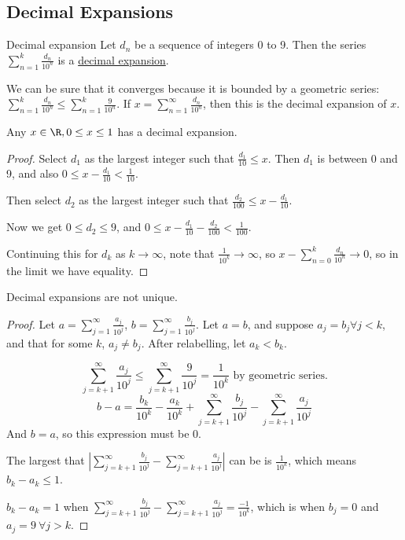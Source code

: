\documentclass[../Main.tex]{subfiles}
\begin{document}
\subsection{Decimal Expansions}
\begin{definition}{Decimal expansion}
    Let $d_n$ be a sequence of integers 0 to 9. Then the series $\sum_{n=1}^{k} \frac{d_n}{10^n}$ is a \underline{decimal expansion}.
\end{definition}
We can be sure that it converges because it is bounded by a geometric series: $\sum_{n=1}^{k} \frac{d_n}{10^n} \leq \sum_{n=1}^{k} \frac{9}{10^n}$.
If $x = \sum_{n=1}^{\infty} \frac{d_n}{10^n}$, then this is the decimal expansion of $x$.
\begin{proposition}
    Any $x \in \R, 0 \leq x \leq 1$ has a decimal expansion.
    \label{propDecimalExpansion}
\end{proposition}
\begin{proof}
    Select $d_1$ as the largest integer such that $\frac{d_1}{10} \leq x$. Then $d_1$ is between 0 and 9, and also $0 \leq x - \frac{d_1}{10} < \frac{1}{10}$.\par
    Then select $d_2$ as the largest integer such that $\frac{d_2}{100} \leq x - \frac{d_1}{10}$.\par
    Now we get $0 \leq d_2 \leq 9$, and $0 \leq x - \frac{d_1}{10} - \frac{d_2}{100} < \frac{1}{100}$.\par
    Continuing this for $d_k$ as $k \rightarrow \infty$, note that $\frac{1}{10^k} \rightarrow \infty$, so $x - \sum_{n=0}^{k} \frac{d_n}{10^n} \rightarrow 0$, so in the limit we have equality.
\end{proof}
\begin{proposition}
    Decimal expansions are not unique.
    \label{propDecimalExpansionUniqueness}
\end{proposition}
\begin{proof}
    Let $a = \sum_{j=1}^{\infty}\frac{a_j}{10^j}$, $b = \sum_{j=1}^{\infty}\frac{b_j}{10^j}$. Let $a = b$, and suppose $a_j = b_j \forall j < k$, and that for some $k$, $a_j \neq b_j$. After relabelling, let $a_k < b_k$.\par
    \begin{equation*}
        \sum_{j=k+1}^{\infty} \frac{a_j}{10^j} \leq \sum_{j=k+1}^{\infty} \frac{9}{10^j} = \frac{1}{10^k} \text{ by geometric series.}
    \end{equation*}
    \begin{equation*}
        b-a = \frac{b_k}{10^k} - \frac{a_k}{10^k} + \sum_{j=k+1}^{\infty} \frac{b_j}{10^j} - \sum_{j=k+1}^{\infty} \frac{a_j}{10^j}
    \end{equation*}
    And $b = a$, so this expression must be 0.\par
    The largest that $\left|\sum_{j=k+1}^{\infty} \frac{b_j}{10^j} - \sum_{j=k+1}^{\infty} \frac{a_j}{10^j}\right|$ can be is $\frac{1}{10^k}$, which means $b_k - a_k \leq 1$.\par
    $b_k - a_k = 1$ when $\sum_{j=k+1}^{\infty} \frac{b_j}{10^j} - \sum_{j=k+1}^{\infty} \frac{a_j}{10^j} = \frac{-1}{10^k}$, which is when $b_j = 0$ and $a_j = 9~\forall j > k$.
\end{proof}
\end{document}
